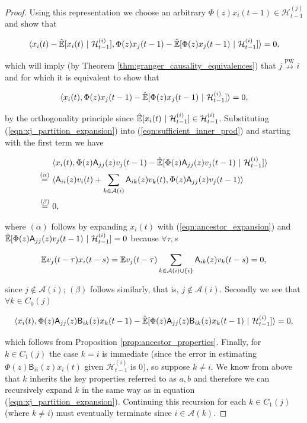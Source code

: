 \documentclass[12pt]{article}
\def\npwgc{\overset{\text{PW}}{\nrightarrow}}  %
\def\B{\mathsf{B}}  %
\def\A{\mathsf{A}}  %
\def\H{\mathcal{H}}  %
\newcommand{\linE}[2]{\hat{\E}[#1\ |\ #2]}  %
\newcommand{\anc}[1]{\mathcal{A}(#1)}  %
\begin{document}
\begin{proof}
  Using this representation we choose an arbitrary $\Phi(z) x_i(t - 1) \in \H_{t - 1}^{(j)}$ and show that

  \begin{equation}
    \inner{x_i(t) - \linE{x_i(t)}{\H_{t - 1}^{(i)}}}{\Phi(z)x_j(t - 1) - \linE{\Phi(z)x_j(t - 1)}{\H_{t - 1}^{(i)}}} = 0,
  \end{equation}

  which will imply (by Theorem \ref{thm:granger_causality_equivalences}) that $j \npwgc i$ and for which it is equivalent to show that

  \begin{equation}
    \label{eqn:sufficient_inner_prod}
    \inner{x_i(t)}{\Phi(z)x_j(t - 1) - \linE{\Phi(z)x_j(t - 1)}{\H_{t - 1}^{(i)}}} = 0,
  \end{equation}

  by the orthogonality principle since $\linE{x_i(t)}{\H_{t - 1}^{(i)}} \in \H_{t - 1}^{(i)}$.  Substituting (\ref{eqn:xj_partition_expansion}) into (\ref{eqn:sufficient_inner_prod}) and starting with the first term we have

  \begin{align*}
    &\inner{x_i(t)}{\Phi(z)\A_{jj}(z)v_j(t - 1) - \linE{\Phi(z)\A_{jj}(z)v_j(t - 1)}{\H_{t - 1}^{(i)}}}\\
    \overset{(\alpha)}{=}\ &\inner{\A_{ii}(z)v_i(t) + \sum_{k \in \anc{i}}\A_{ik}(z)v_k(t)}{\Phi(z)\A_{jj}(z)v_j(t - 1)}\\
    \overset{(\beta)}{=}\ &0,
  \end{align*}

  where $(\alpha)$ follows by expanding $x_i(t)$ with (\ref{eqn:ancestor_expansion}) and $\linE{\Phi(z)\A_{jj}(z)v_j(t - 1)}{\H_{t - 1}^{(i)}} = 0$ because $\forall \tau, s$

  \begin{equation*}
    \E v_j(t - \tau) x_i(t - s) = \E v_j(t - \tau) \sum_{k \in \anc{i} \cup \{i\}}\A_{ik}(z)v_k(t - s) = 0,
  \end{equation*}

  since $j \not \in \anc{i}$; $(\beta)$ follows similarly, that is, $j \not \in \anc{i}$.  Secondly we see that $\forall k \in C_0(j)$

  \begin{equation*}
    \inner{x_i(t)}{\Phi(z)\A_{jj}(z)\B_{ik}(z)x_k(t - 1) - \linE{\Phi(z)\A_{jj}(z)\B_{ik}(z)x_k(t - 1)}{\H_{t - 1}^{(i)}}} = 0,
  \end{equation*}

  which follows from Proposition \ref{prop:ancestor_properties}.
  Finally, for $k \in C_1(j)$ the case $k = i$ is immediate (since the
  error in estimating $\Phi(z)\B_{ii}(z)x_i(t)$ given
  $\H_{t - 1}^{(i)}$ is $0$), so suppose $k \ne i$.  We know from
  above that $k$ inherits the key properties referred to as $a, b$ and
  therefore we can recursively expand $k$ in the same way as in
  equation (\ref{eqn:xj_partition_expansion}).  Continuing this
  recursion for each $k \in C_1(j)$ (where $k \ne i$) must eventually
  terminate since $i \in \anc{k}$.
\end{proof}
\end{document}
